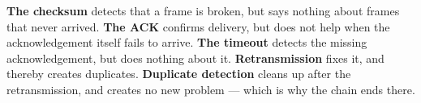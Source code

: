 \textbf{The checksum} detects that a frame is broken, but says nothing about frames that never
arrived. \textbf{The ACK} confirms delivery, but does not help when the acknowledgement itself
fails to arrive. \textbf{The timeout} detects the missing acknowledgement, but does nothing about
it. \textbf{Retransmission} fixes it, and thereby creates duplicates. \textbf{Duplicate detection}
cleans up after the retransmission, and creates no new problem --- which is why the chain ends
there.
